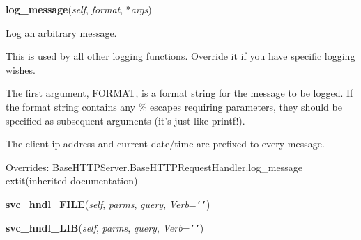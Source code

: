     \vspace{0.5ex}

\hspace{.8\funcindent}\begin{boxedminipage}{\funcwidth}

    \raggedright \textbf{log\_message}(\textit{self}, \textit{format}, *\textit{args})

\setlength{\parskip}{2ex}
    Log an arbitrary message.

    This is used by all other logging functions.  Override it if you have 
    specific logging wishes.

    The first argument, FORMAT, is a format string for the message to be 
    logged.  If the format string contains any \% escapes requiring 
    parameters, they should be specified as subsequent arguments (it's just
    like printf!).

    The client ip address and current date/time are prefixed to every 
    message.

\setlength{\parskip}{1ex}
      Overrides: BaseHTTPServer.BaseHTTPRequestHandler.log\_message 	extit{(inherited documentation)}

    \end{boxedminipage}

    \label{Proxy:Proxy:svc_hndl_FILE}

    \vspace{0.5ex}

\hspace{.8\funcindent}\begin{boxedminipage}{\funcwidth}

    \raggedright \textbf{svc\_hndl\_FILE}(\textit{self}, \textit{parms}, \textit{query}, \textit{Verb}={\tt \texttt{'}\texttt{}\texttt{'}})

\setlength{\parskip}{2ex}
\setlength{\parskip}{1ex}
    \end{boxedminipage}

    \label{Proxy:Proxy:svc_hndl_LIB}

    \vspace{0.5ex}

\hspace{.8\funcindent}\begin{boxedminipage}{\funcwidth}

    \raggedright \textbf{svc\_hndl\_LIB}(\textit{self}, \textit{parms}, \textit{query}, \textit{Verb}={\tt \texttt{'}\texttt{}\texttt{'}})

\setlength{\parskip}{2ex}
\setlength{\parskip}{1ex}
    \end{boxedminipage}

